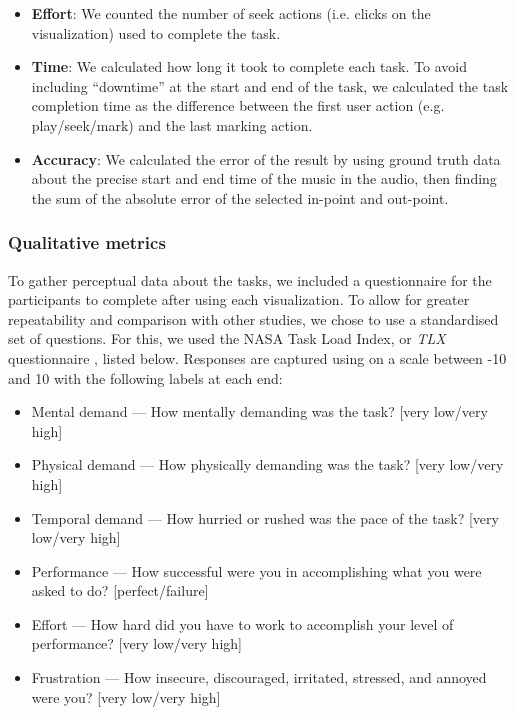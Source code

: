 \begin{itemize}
  \item \textbf{Effort}: We counted the number of seek actions (i.e. clicks on the visualization) used to complete the
    task.
  \item \textbf{Time}: We calculated how long it took to complete each task. To avoid including ``downtime'' at the
    start and end of the task, we calculated the task completion time as the difference between the first user action
    (e.g.  play/seek/mark) and the last marking action.
  \item \textbf{Accuracy}: We calculated the error of the result by using ground truth data about the precise start and
    end time of the music in the audio, then finding the sum of the absolute error of the selected in-point and
    out-point.
\end{itemize}

\subsubsection{Qualitative metrics}

To gather perceptual data about the tasks, we included a questionnaire for the participants to complete after using
each visualization. To allow for greater repeatability and comparison with other studies, we chose to use a
standardised set of questions. For this, we used the NASA Task Load Index, or \textit{TLX} questionnaire
\citep{Hart1988}, listed below.  Responses are captured using on a scale between -10 and 10 with the following labels
at each end:


{\singlespacing
\begin{itemize}
  \item Mental demand --- How mentally demanding was the task? [very low/very high]
  \item Physical demand --- How physically demanding was the task? [very low/very high]
  \item Temporal demand --- How hurried or rushed was the pace of the task?  [very low/very high]
  \item Performance --- How successful were you in accomplishing what you were asked to do? [perfect/failure]
  \item Effort --- How hard did you have to work to accomplish your level of performance? [very low/very high]
  \item Frustration --- How insecure, discouraged, irritated, stressed, and annoyed were you? [very low/very high]
\end{itemize}
}

